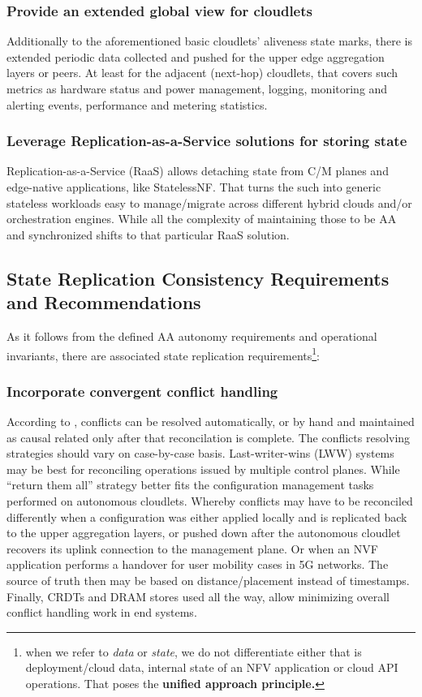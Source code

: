 \documentclass[conference]{IEEEtran}
\begin{document}
\subsubsection{Provide an extended global view for cloudlets}
Additionally to the aforementioned basic cloudlets' aliveness state marks,
there is extended periodic data collected and pushed for the upper edge
aggregation layers or peers. At least for the adjacent (next-hop) cloudlets,
that covers such metrics as hardware status and power management, logging,
monitoring and alerting events, performance and metering statistics.

\subsubsection{Leverage Replication-as-a-Service solutions for storing state}
Replication-as-a-Service (RaaS) allows detaching state from C/M planes and
edge-native applications, like StatelessNF\cite{b16}. That turns the such into
generic stateless workloads easy to manage/migrate across different hybrid
clouds and/or orchestration engines. While all the complexity of maintaining
those to be AA and synchronized shifts to that particular RaaS solution.

\subsection{State Replication Consistency Requirements and Recommendations}
As it follows from the defined AA autonomy requirements and operational
invariants, there are associated state replication requirements\footnote{when
we refer to \textit{data} or \textit{state}, we do not differentiate either
that is deployment/cloud data, internal state of an NFV application or cloud
API operations. That poses the \textbf{unified approach principle.}}:

\subsubsection{Incorporate convergent conflict handling}
According to \cite{b1}, conflicts can be resolved automatically, or by hand and
maintained as causal related only after that reconcilation is complete. The
conflicts resolving strategies should vary on case-by-case basis.
Last-writer-wins (LWW) systems\cite{b1}\cite{b13} may be best for
reconciling operations issued by multiple control planes. While ``return them
all''\cite{b1}\cite{b17} strategy better fits the configuration management tasks
performed on autonomous cloudlets. Whereby conflicts may have to be reconciled
differently when a configuration was either applied locally and is replicated
back to the upper aggregation layers, or pushed down after the autonomous
cloudlet recovers its uplink connection to the management plane. Or when an NVF
application performs a handover for user mobility cases in 5G networks. The
source of truth then may be based on distance/placement instead of timestamps.
Finally, CRDTs and DRAM stores used all the way, allow minimizing overall
conflict handling work in end systems.
\end{document}
